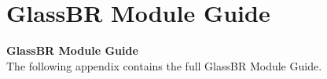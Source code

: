 \chapter{GlassBR Module Guide}
\label{appendix:glassbr-mg}

\vspace*{\fill}
\begin{center}
    \textbf{GlassBR Module Guide}\\[2em]
    The following appendix contains the full GlassBR Module Guide.
\end{center}
\vspace*{\fill}
\clearpage

